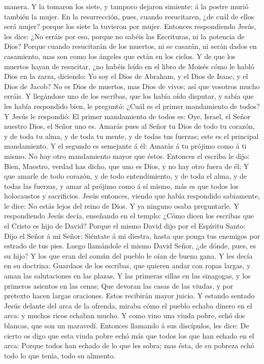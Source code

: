 manera.  Y la tomaron los siete, y tampoco dejaron
simiente: á la postre murió también la mujer.  En la
resurrección, pues, cuando resucitaren, ¿de cuál de ellos será mujer?
porque los siete la tuvieron por mujer.  Entonces
respondiendo Jesús, les dice: ¿No erráis por eso, porque no sabéis las
Escrituras, ni la potencia de Dios?  Porque cuando
resucitarán de los muertos, ni se casarán, ni serán dados en casamiento,
mas son como los ángeles que están en los cielos.  Y de que
los muertos hayan de resucitar, ¿no habéis leído en el libro de Moisés
cómo le habló Dios en la zarza, diciendo: Yo soy el Dios de Abraham, y
el Dios de Isaac, y el Dios de Jacob?  No es Dios de
muertos, mas Dios de vivos; así que vosotros mucho erráis. 
Y llegándose uno de los escribas, que los había oído disputar, y sabía
que les había respondido bien, le preguntó: ¿Cuál es el primer
mandamiento de todos?  Y Jesús le respondió: El primer
mandamiento de todos es: Oye, Israel, el Señor nuestro Dios, el Señor
uno es.  Amarás pues al Señor tu Dios de todo tu corazón, y
de toda tu alma, y de toda tu mente, y de todas tus fuerzas; este es el
principal mandamiento.  Y el segundo es semejante á él:
Amarás á tu prójimo como á ti mismo. No hay otro mandamiento mayor que
éstos.  Entonces el escriba le dijo: Bien, Maestro, verdad
has dicho, que uno es Dios, y no hay otro fuera de él;  Y
que amarle de todo corazón, y de todo entendimiento, y de toda el alma,
y de todas las fuerzas, y amar al prójimo como á sí mismo, más es que
todos los holocaustos y sacrificios.  Jesús entonces,
viendo que había respondido sabiamente, le dice: No estás lejos del
reino de Dios. Y ya ninguno osaba preguntarle.  Y
respondiendo Jesús decía, enseñando en el templo: ¿Cómo dicen los
escribas que el Cristo es hijo de David?  Porque el mismo
David dijo por el Espíritu Santo: Dijo el Señor á mi Señor: Siéntate á
mi diestra, hasta que ponga tus enemigos por estrado de tus pies.
 Luego llamándole el mismo David Señor, ¿de dónde, pues, es
su hijo? Y los que eran del común del pueblo le oían de buena gana.
 Y les decía en su doctrina: Guardaos de los escribas, que
quieren andar con ropas largas, y aman las salutaciones en las plazas,
 Y las primeras sillas en las sinagogas, y los primeros
asientos en las cenas;  Que devoran las casas de las
viudas, y por pretexto hacen largas oraciones. Estos recibirán mayor
juicio.  Y estando sentado Jesús delante del arca de la
ofrenda, miraba cómo el pueblo echaba dinero en el arca: y muchos ricos
echaban mucho.  Y como vino una viuda pobre, echó dos
blancas, que son un maravedí.  Entonces llamando á sus
discípulos, les dice: De cierto os digo que esta viuda pobre echó más
que todos los que han echado en el arca:  Porque todos han
echado de lo que les sobra; mas ésta, de su pobreza echó todo lo que
tenía, todo su alimento.

